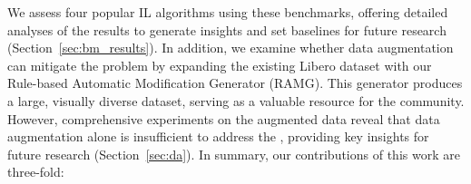 We assess four popular IL algorithms using these benchmarks, offering detailed analyses of the results to generate insights and set baselines for future research (Section~\ref{sec:bm_results}). %
In addition, we examine whether data augmentation can mitigate the \pb problem by expanding the existing Libero dataset with our Rule-based Automatic Modification Generator (RAMG). This generator produces a large, visually diverse dataset, serving as a valuable resource for the community. However, comprehensive experiments on the augmented data reveal that data augmentation alone is insufficient to address the \pb, providing key insights for future research (Section~\ref{sec:da}). In summary, our contributions of this work are three-fold:



